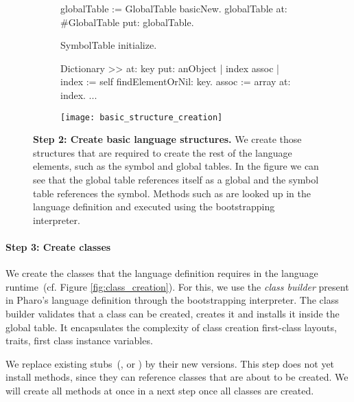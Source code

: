 \begin{figure}[ht]
\begin{subfigure}{.45\linewidth}
\begin{code}
globalTable := GlobalTable basicNew.
globalTable
    at: #GlobalTable
    put: globalTable.
    
SymbolTable initialize.
\end{code}

\begin{code}
Dictionary >> at: key put: anObject 
	| index assoc |
	index := self findElementOrNil: key.
	assoc := array at: index.
	...
\end{code}
\end{subfigure}
\begin{subfigure}{.55\linewidth}
\texttt{[image: basic\_structure\_creation]}
\end{subfigure}
\caption{\textbf{Step 2: Create basic language structures.} We create those structures that are required to create the rest of the language elements, such as the symbol and global tables. In the figure we can see that the global table references itself as a global and the symbol table references the  symbol. Methods such as  are looked up in the language definition and executed using the bootstrapping interpreter.\label{fig:basic_structure_creation}}
\end{figure}

\paragraph{\textbf{Step 3: Create classes}}
We create the classes that the language definition requires in the language runtime~(cf. Figure \ref{fig:class_creation}). For this, we use the \emph{class builder} present in Pharo's language definition through the bootstrapping interpreter. The class builder validates that a class can be created, creates it and installs it inside the global table. It encapsulates the complexity of class creation \eg first-class layouts, traits, first class instance variables.

We replace existing stubs~(\eg {},  or ) by their new versions. This step does not yet install methods, since they can reference classes that are about to be created. We will create all methods at once in a next step once all classes are created.

